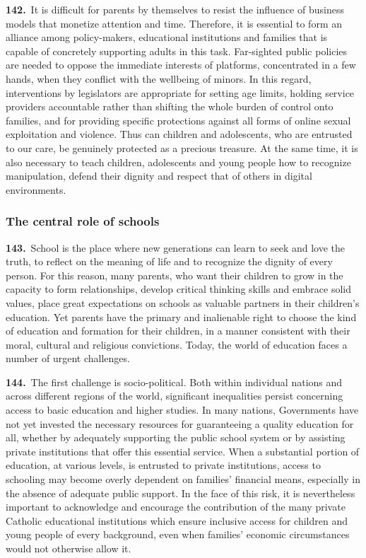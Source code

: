 \documentclass{article}
\begin{document}
\textbf{142.}\ It is difficult for parents by themselves to resist the influence of business models that monetize attention and time. Therefore, it is essential to form an alliance among policy-makers, educational institutions and families that is capable of concretely supporting adults in this task. Far-sighted public policies are needed to oppose the immediate interests of platforms, concentrated in a few hands, when they conflict with the wellbeing of minors. In this regard, interventions by legislators are appropriate for setting age limits, holding service providers accountable rather than shifting the whole burden of control onto families, and for providing specific protections against all forms of online sexual exploitation and violence. Thus can children and adolescents, who are entrusted to our care, be genuinely protected as a precious treasure.\cite{n148} At the same time, it is also necessary to teach children, adolescents and young people how to recognize manipulation, defend their dignity and respect that of others in digital environments.\cite{n149}

\subsubsection{The central role of schools}

\textbf{143.}\ School is the place where new generations can learn to seek and love the truth, to reflect on the meaning of life and to recognize the dignity of every person. For this reason, many parents, who want their children to grow in the capacity to form relationships, develop critical thinking skills and embrace solid values, place great expectations on schools as valuable partners in their children's education. Yet parents have the primary and inalienable right to choose the kind of education and formation for their children, in a manner consistent with their moral, cultural and religious convictions. Today, the world of education faces a number of urgent challenges.

\textbf{144.}\ The first challenge is socio-political. Both within individual nations and across different regions of the world, significant inequalities persist concerning access to basic education and higher studies. In many nations, Governments have not yet invested the necessary resources for guaranteeing a quality education for all, whether by adequately supporting the public school system or by assisting private institutions that offer this essential service. When a substantial portion of education, at various levels, is entrusted to private institutions, access to schooling may become overly dependent on families' financial means, especially in the absence of adequate public support. In the face of this risk, it is nevertheless important to acknowledge and encourage the contribution of the many private Catholic educational institutions which ensure inclusive access for children and young people of every background, even when families' economic circumstances would not otherwise allow it.
\end{document}
